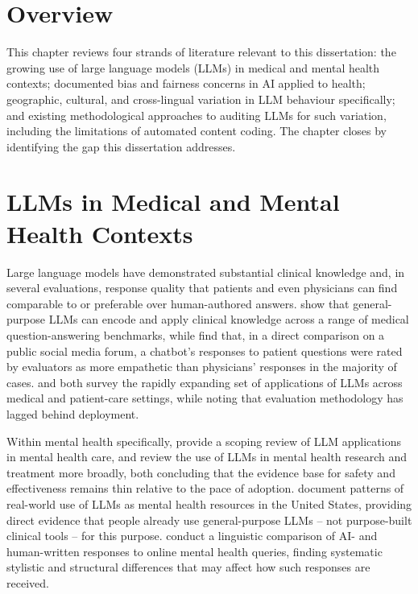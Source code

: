 \section{Overview}

This chapter reviews four strands of literature relevant to this dissertation: the growing use of large language models (LLMs) in medical and mental health contexts; documented bias and fairness concerns in AI applied to health; geographic, cultural, and cross-lingual variation in LLM behaviour specifically; and existing methodological approaches to auditing LLMs for such variation, including the limitations of automated content coding. The chapter closes by identifying the gap this dissertation addresses.

\section{LLMs in Medical and Mental Health Contexts}

Large language models have demonstrated substantial clinical knowledge and, in several evaluations, response quality that patients and even physicians can find comparable to or preferable over human-authored answers. \citet{singhal2023clinical} show that general-purpose LLMs can encode and apply clinical knowledge across a range of medical question-answering benchmarks, while \citet{ayers2023chatbot} find that, in a direct comparison on a public social media forum, a chatbot's responses to patient questions were rated by evaluators as more empathetic than physicians' responses in the majority of cases. \citet{wang2024healthcare} and \citet{busch2025patientcare} both survey the rapidly expanding set of applications of LLMs across medical and patient-care settings, while noting that evaluation methodology has lagged behind deployment.

Within mental health specifically, \citet{hua2025mentalhealth} provide a scoping review of LLM applications in mental health care, and \citet{mesquiti2026mentalhealth} review the use of LLMs in mental health research and treatment more broadly, both concluding that the evidence base for safety and effectiveness remains thin relative to the pace of adoption. \citet{rousmaniere2025mentalhealth} document patterns of real-world use of LLMs as mental health resources in the United States, providing direct evidence that people already use general-purpose LLMs -- not purpose-built clinical tools -- for this purpose. \citet{saha2025linguistic} conduct a linguistic comparison of AI- and human-written responses to online mental health queries, finding systematic stylistic and structural differences that may affect how such responses are received.

